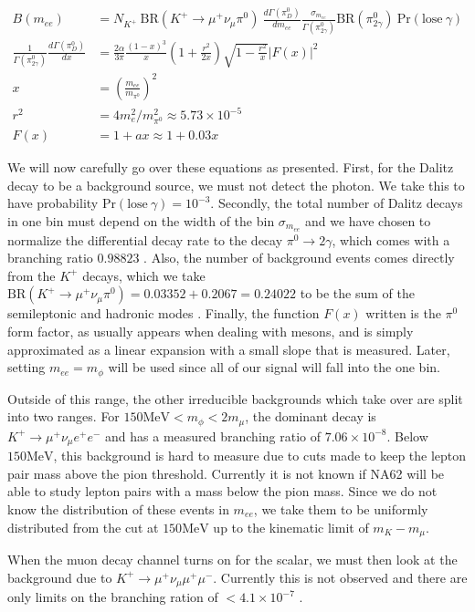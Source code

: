 \begin{align}
\label{eqn:kaon_dalitz_background}
B(m_{ee}) &= N_{K^+}~\textrm{BR}(K^+ \rightarrow \mu^+ \nu_\mu \pi^0)~\frac{d\Gamma(\pi^0_D)}{d m_{ee}} \frac{\sigma_{m_{ee}}}{\Gamma(\pi^0_{2\gamma})} \textrm{BR}(\pi^0_{2\gamma})~\textrm{Pr}(\textrm{lose}~\gamma) \\
\frac{1}{\Gamma(\pi^0_{2\gamma})} \frac{d\Gamma(\pi^0_D)}{dx} &= \frac{2\alpha}{3\pi} \frac{(1-x)^3}{x}(1+\frac{r^2}{2x})\sqrt{1-\frac{r^2}{x}}\left|F(x)\right|^2 \\
x &= \left(\frac{m_{ee}}{m_{\pi^0}}\right)^2 \\
r^2 &= 4 m_e^2 / m_{\pi^0}^2 \approx 5.73\times 10^{-5} \\
F(x) &= 1 + ax \approx 1+0.03x
\end{align}

We will now carefully go over these equations as presented.
First, for the Dalitz decay to be a background source, we must not detect the photon.
We take this to have probability $\textrm{Pr}(\textrm{lose}~\gamma) = 10^{-3}$.
Secondly, the total number of Dalitz decays in one bin must depend on the width of the bin $\sigma_{m_{ee}}$ and we have chosen to normalize the differential decay rate to the decay $\pi^0 \rightarrow 2\gamma$, which comes with a branching ratio $0.98823$ \cite{Agashe:2014kda}.
Also, the number of background events comes directly from the $K^+$ decays, which we take $\textrm{BR}(K^+ \rightarrow \mu^+ \nu_\mu \pi^0) = 0.03352 + 0.2067 = 0.24022$ to be the sum of the semileptonic and hadronic modes \cite{Agashe:2014kda}.
Finally, the function $F(x)$ written is the $\pi^0$ form factor, as usually appears when dealing with mesons, and is simply approximated as a linear expansion with a small slope that is measured.
Later, setting $m_{ee} = m_\phi$ will be used since all of our signal will fall into the one bin.

Outside of this range, the other irreducible backgrounds which take over are split into two ranges.
For $150\textrm{MeV} < m_\phi < 2m_\mu$, the dominant decay is $K^+ \rightarrow \mu^+ \nu_\mu e^+ e^-$ and has a measured branching ratio of $7.06 \times 10^{-8}$.
Below $150\textrm{MeV}$, this background is hard to measure due to cuts made to keep the lepton pair mass above the pion threshold.
Currently it is not known if NA62 will be able to study lepton pairs with a mass below the pion mass.
Since we do not know the distribution of these events in $m_{ee}$, we take them to be uniformly distributed from the cut at $150\textrm{MeV}$ up to the kinematic limit of $m_K - m_\mu$.

When the muon decay channel turns on for the scalar, we must then look at the background due to $K^+ \rightarrow \mu^+ \nu_\mu \mu^+ \mu^-$.
Currently this is not observed and there are only limits on the branching ration of $< 4.1 \times 10^{-7}$ \cite{Agashe:2014kda}.
